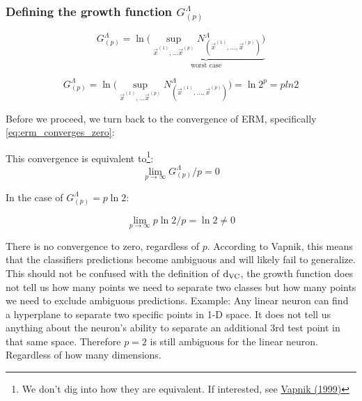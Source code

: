 \begin{frame} \frametitle{Defining the growth function $G_{(p)}^\Lambda$}

		
	\begin{equation} 
			G_{(p)}^\Lambda = \ln \underbrace{ \bigg( 
				\sup_{\vec{x}^{(1)}, \ldots \vec{x}^{(p)}}
				N_{(\vec{x}^{(1)}, \ldots, \vec{x}^{(p)})}^\Lambda \bigg) }_{
					\text{worst case}}
	\end{equation}
	
	\pause
	
	\begin{equation}
	G_{(p)}^\Lambda = \ln \bigg( 
				\sup_{\vec{x}^{(1)}, \ldots \vec{x}^{(p)}}
				N_{(\vec{x}^{(1)}, \ldots, \vec{x}^{(p)})}^\Lambda \bigg) = \ln 2^p = p ln 2
	\end{equation}
	
	Before we proceed, we turn back to the convergence of ERM, specifically \eqref{eq:erm_converges_zero}:
	\mode<presentation>{
				\begin{equation*}
				\lim_{p \to \infty} P\bigg\{ 
					{
						\Big|R_{[\vec w_p]} - R_{[\vec w_0]}\Big| 
					}
				\geq \eta \bigg\}\;\;=\;\; 0 \,, \quad \forall \eta > 0
			\end{equation*}
	}
	
	This convergence is equivalent to\footnote{We don't dig into how they are equivalent. If interested, see \href{https://www.math.arizona.edu/~hzhang/math574m/Read/vapnik.pdf}{Vapnik (1999)}}:
	\begin{equation}
	\lim_{p \to \infty} G_{(p)}^\Lambda / p = 0
	\end{equation}
	
	In the case of $G_{(p)}^\Lambda = p \ln 2$:
	
	\begin{equation}
	\lim_{p \to \infty} p \ln 2 / p = \ln 2 \ne 0
	\end{equation}
	
	There is no convergence to zero, regardless of $p$. According to Vapnik, this means that the classifiers predictions become ambiguous and will likely fail to generalize. This should not be confused with the definition of $\mathrm{d}_{\mathrm{VC}}$, the growth function does not tell us how many points we need to separate two classes but how many points we need to exclude ambiguous predictions. Example: Any linear neuron can find a hyperplane to separate two specific points in 1-D space. It does not tell us anything about the neuron's ability to separate an additional 3rd test point in that same space. Therefore $p = 2$ is still ambiguous for the linear neuron. Regardless of how many dimensions.
	

\end{frame}
